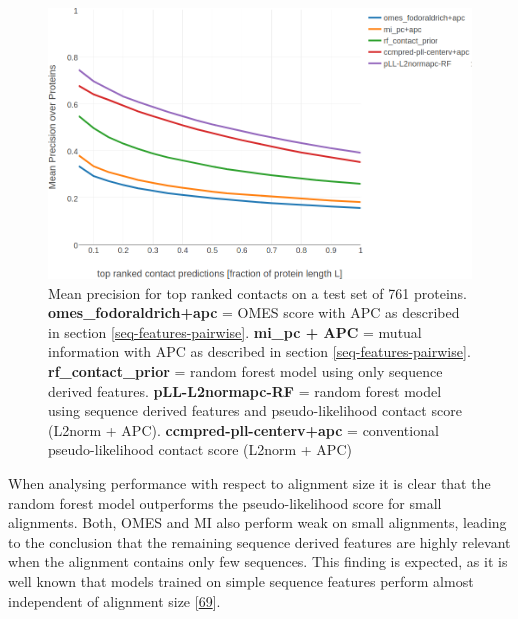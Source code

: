 \documentclass[12pt,a4paper,twoside]{book}
\theoremstyle{definition}
\theoremstyle{definition}
\theoremstyle{remark}
\begin{document}
\begin{figure}
\includegraphics[width=1\linewidth]{img/random_forest_contact_prior/precision_vs_rank_notitle} \caption{Mean precision for top
ranked contacts on a test set of 761 proteins.
\textbf{omes\_fodoraldrich+apc} = OMES score with APC as described in
section \ref{seq-features-pairwise}. \textbf{mi\_pc + APC} = mutual
information with APC as described in section
\ref{seq-features-pairwise}. \textbf{rf\_contact\_prior} = random forest
model using only sequence derived features. \textbf{pLL-L2normapc-RF} =
random forest model using sequence derived features and
pseudo-likelihood contact score (L2norm + APC).
\textbf{ccmpred-pll-centerv+apc} = conventional pseudo-likelihood
contact score (L2norm + APC)}\label{fig:performance-rf-with-pll-score}
\end{figure}

When analysing performance with respect to alignment size it is clear
that the random forest model outperforms the pseudo-likelihood score for
small alignments. Both, OMES and MI also perform weak on small
alignments, leading to the conclusion that the remaining sequence
derived features are highly relevant when the alignment contains only
few sequences. This finding is expected, as it is well known that models
trained on simple sequence features perform almost independent of
alignment size {[}\protect\hyperlink{ref-Stahl2017}{69}{]}.
\end{document}
